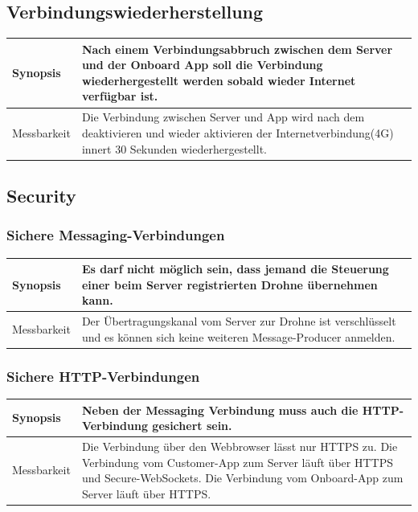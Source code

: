 \subsection{Verbindungswiederherstellung}
\begin{tabular}{|p{}|p{}|} \hline
	Synopsis & Nach einem Verbindungsabbruch zwischen dem Server und der Onboard App soll die Verbindung wiederhergestellt werden sobald wieder Internet verfügbar ist. \\ \hline
	
	Messbarkeit & Die Verbindung zwischen Server und App wird nach dem deaktivieren und wieder aktivieren der Internetverbindung(4G) innert 30 Sekunden wiederhergestellt.\\ \hline
\end{tabular}

\subsection{Security}
\subsubsection{Sichere Messaging-Verbindungen}
\begin{tabular}{|p{}|p{}|} \hline
	Synopsis & Es darf nicht möglich sein, dass jemand die Steuerung einer beim Server registrierten Drohne übernehmen kann.\\ \hline
	Messbarkeit & Der Übertragungskanal vom Server zur Drohne ist verschlüsselt und es können sich keine weiteren \Gls{Message-Producer} anmelden.\\ \hline
\end{tabular}

\subsubsection{Sichere HTTP-Verbindungen}
\begin{tabular}{|p{}|p{}|} \hline
	Synopsis & Neben der Messaging Verbindung muss auch die HTTP-Verbindung gesichert sein.\\ \hline
	Messbarkeit & Die Verbindung über den Webbrowser lässt nur HTTPS zu. Die Verbindung vom Customer-App zum Server läuft über HTTPS und Secure-WebSockets. Die Verbindung vom Onboard-App zum Server läuft über HTTPS.\\ \hline
\end{tabular}

